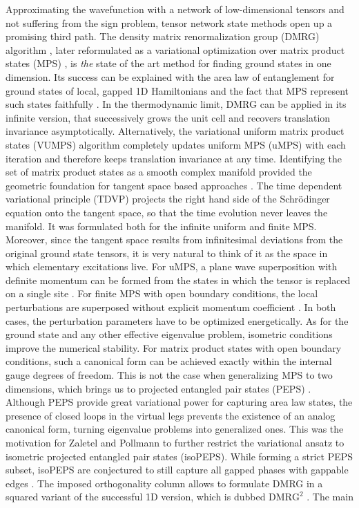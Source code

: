 Approximating the wavefunction with a network of low-dimensional tensors and not suffering from the sign problem, tensor network state methods open up a promising third path. The density matrix renormalization group (DMRG) algorithm \cite{white1992density}, later reformulated as a variational optimization over matrix product states (MPS) \cite{schollwock2011density}, is \textit{the} state of the art method for finding ground states in one dimension. Its success can be explained with the area law of entanglement \cite{hastings2007area} for ground states of local, gapped 1D Hamiltonians and the fact that MPS represent such states faithfully \cite{verstraete2006matrix}. In the thermodynamic limit, DMRG can be applied in its infinite version, that successively grows the unit cell and recovers translation invariance asymptotically. Alternatively, the variational uniform matrix product states (VUMPS) algorithm \cite{zauner2018variational} completely updates uniform MPS (uMPS) with each iteration and therefore keeps translation invariance at any time. Identifying the set of matrix product states as a smooth complex manifold \cite{haegeman2014geometry} provided the geometric foundation for tangent space based approaches \cite{haegeman2013post}. The time dependent variational principle (TDVP) projects the right hand side of the Schrödinger equation onto the tangent space, so that the time evolution never leaves the manifold. It was formulated both for the infinite uniform \cite{haegeman2011time} and finite \cite{haegeman2016unifying} MPS. Moreover, since the tangent space results from infinitesimal deviations from the original ground state tensors, it is very natural to think of it as the space in which elementary excitations live. For uMPS, a plane wave superposition with definite momentum can be formed from the states in which the tensor is replaced on a single site \cite{haegeman2012variational, vanderstraeten2019tangent}. For finite MPS with open boundary conditions, the local perturbations are superposed without explicit momentum coefficient \cite{van2021efficient}. In both cases, the perturbation parameters have to be optimized energetically. As for the ground state and any other effective eigenvalue problem, isometric conditions improve the numerical stability. For matrix product states with open boundary conditions, such a canonical form can be achieved exactly within the internal gauge degrees of freedom. This is not the case when generalizing MPS to two dimensions, which brings us to projected entangled pair states (PEPS) \cite{verstraete2004renormalization}. Although PEPS provide great variational power for capturing area law states, the presence of closed loops in the virtual legs prevents the existence of an analog canonical form, turning eigenvalue problems into generalized ones. This was the motivation for Zaletel and Pollmann \cite{zaletel2020isometric} to further restrict the variational ansatz to isometric projected entangled pair states (isoPEPS). While forming a strict PEPS subset, isoPEPS are conjectured to still capture all gapped phases with gappable edges \cite{soejima2020isometric}. The imposed orthogonality column allows to formulate DMRG in a squared variant of the successful 1D version, which is dubbed $\text{DMRG}^{2}$ \cite{lin2022efficient}. The main 